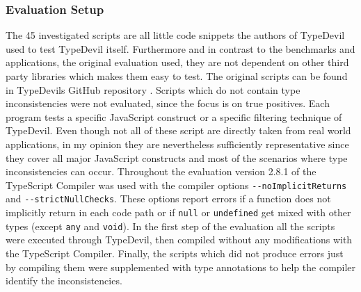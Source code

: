 \documentclass[runningheads,a4paper]{llncs}
\begin{document}
\subsubsection{Evaluation Setup}
The 45 investigated scripts are all little code snippets the authors of TypeDevil used to test TypeDevil itself. 
Furthermore and in contrast to the benchmarks and applications, the original evaluation used, they are not dependent on other third party libraries which makes them easy to test.
The original scripts can be found in TypeDevils GitHub repository \cite{TypeDevilGitHubTests}.
Scripts which do not contain type inconsistencies were not evaluated, since the focus is on true positives.
Each program tests a specific JavaScript construct or a specific filtering technique of TypeDevil.
Even though not all of these script are directly taken from real world applications, in my opinion they are nevertheless sufficiently representative since they cover all major JavaScript constructs and most of the scenarios where type inconsistencies can occur.
Throughout the evaluation version 2.8.1 of the TypeScript Compiler was used with the compiler options \lstinline[columns=fixed]{--noImplicitReturns} and \lstinline[columns=fixed]{--strictNullChecks}.
These options report errors if a function does not implicitly return in each code path or if \lstinline[columns=fixed]{null} or \lstinline[columns=fixed]{undefined} get mixed with other types (except \lstinline[columns=fixed]{any} and \lstinline[columns=fixed]{void}).
In the first step of the evaluation all the scripts were executed through TypeDevil, then compiled without any modifications with the TypeScript Compiler.
Finally, the scripts which did not produce errors just by compiling them were supplemented with type annotations to help the compiler identify the inconsistencies.
\end{document}
